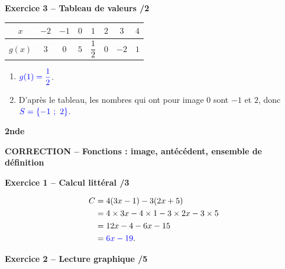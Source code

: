 \documentclass[10pt,a4paper]{article}
\renewcommand{\niveau}{2nde}
\renewcommand{\chapitre}{Fonctions : image, antécédent, ensemble de définition}
\renewcommand{\interroversion}[1]{
    \noindent\textbf{\niveau}

    \vspace{-0.5cm}
    \begin{center}
        \textbf{\large CORRECTION -- \chapitre}
    \end{center}

    \vspace{0.1cm}
}
\begin{document}
\vspace{0.5cm}

\textbf{Exercice 3 -- Tableau de valeurs \hfill /2}

\begin{center}
\begin{tabular}{|*{8}{c|}}
    \hline
    \(x\) & \(-2\) & \(-1\) & \(0\) & \(1\) & \(2\) & \(3\) & \(4\) \\
    \hline
    \(g(x)\) & \(3\) & \(0\) & \(5\) & \(\dfrac{1}{2}\) & \(0\) & \(-2\) & \(1\) \\
    \hline
\end{tabular}
\end{center}

\begin{enumerate}
    \item \(\textcolor{blue}{g(1)=\dfrac{1}{2}}\).
    \item D'après le tableau, les nombres qui ont pour image \(0\) sont \(-1\) et \(2\), donc \(\textcolor{blue}{S=\{-1\ ;\ 2\}}\).
\end{enumerate}

\newpage


\interroversion{C}

\textbf{Exercice 1 -- Calcul littéral \hfill /3}

\[
\begin{aligned}
C&=4(3x-1)-3(2x+5)\\
&=4\times3x-4\times1-3\times2x-3\times5\\
&=12x-4-6x-15\\
&=\textcolor{blue}{6x-19}.
\end{aligned}
\]

\textbf{Exercice 2 -- Lecture graphique \hfill /5}
\end{document}
